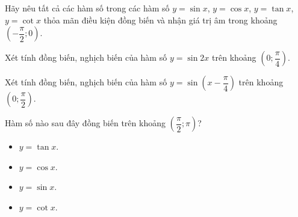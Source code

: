 \begin{vd}%
	[Mức độ 1]
	Hãy nêu tất cả các hàm số trong các hàm số $ y = \sin x$, $y = \cos x$, $y = \tan x$, $y = \cot x $ thỏa mãn điều kiện đồng biến và nhận giá trị âm trong khoảng $ \left ( - \dfrac{\pi}{2};0 \right ) $.
\end{vd}

\begin{vd}%
	[Mức độ 1]
	Xét tính đồng biến, nghịch biến của hàm số $y=\sin 2x$ trên khoảng $\left(0;\dfrac{\pi}{4}\right)$.
\end{vd}

\begin{vd}%
	[Mức độ 1]
	Xét tính đồng biến, nghịch biến của hàm số $y=\sin\left(x-\dfrac{\pi}{4}\right)$ trên khoảng $\left(0;\dfrac{\pi}{2}\right)$.
\end{vd}

\begin{bt}%
	[Mức độ 1]
	Hàm số nào sau đây đồng biến trên khoảng $\left(\dfrac{\pi}{2};\pi\right)$?
	\begin{itemize}
		\item $y=\tan x$.
		\item $y=\cos x$.
		\item $y=\sin x$.
		\item $y=\cot x$.
	\end{itemize}
\end{bt}

